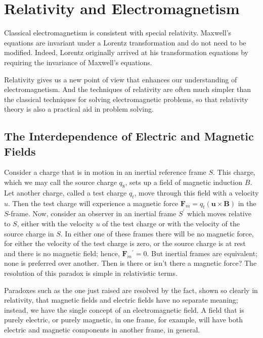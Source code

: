 \chapter{Relativity and Electromagnetism}
Classical electromagnetism is consistent with special relativity. Maxwell's equations are invariant under a Lorentz transformation and do not need to be modified. Indeed, Lorentz originally arrived at his transformation equations by requiring the invariance of Maxwell's equations. 

Relativity gives us a new point of view that enhances our understanding of electromagnetism. And the techniques of relativity are often much simpler than the classical techniques for solving electromagnetic problems, so that relativity theory is also a practical aid in problem solving.

\section{The Interdependence of Electric and Magnetic Fields}
Consider a charge that is in motion in an inertial reference frame $S$. This charge, which we may call the source charge $q_{8}$, sets up a field of magnetic induction $B$. Let another charge, called a test charge $q_{t}$, move through this field with a velocity $u$. Then the test charge will experience a magnetic force $\mathbf{F}_{m}=q_{t}(\mathbf{u} \times \mathbf{B})$ in the $S$-frame. Now, consider an observer in an inertial frame $S^{\prime}$ which moves relative to $S$, either with the velocity $u$ of the test charge or with the velocity of the source charge in $S$. In either one of these frames there will be no magnetic force, for either the velocity of the test charge is zero, or the source charge is at rest and there is no magnetic field; hence, $\mathbf{F}_{m}{ }^{\prime}=0$. But inertial frames are equivalent; none is preferred over another. Then is there or isn't there a magnetic force? The resolution of this paradox is simple in relativistic terms.

Paradoxes such as the one just raised are resolved by the fact, shown so clearly in relativity, that magnetic fields and electric fields have no separate meaning; instead, we have the single concept of an electromagnetic field. A field that is purely electric, or purely magnetic, in one frame, for example, will have both electric and magnetic components in another frame, in general. 
